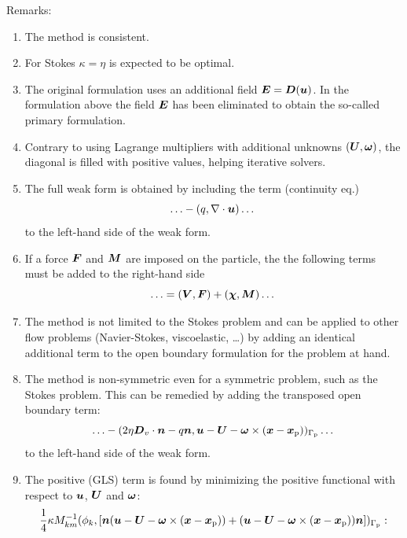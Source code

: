 Remarks:
\begin{enumerate}
   \item The method is consistent.
   \item For Stokes $\kappa=\eta$ is expected to be optimal.
   \item The original formulation \cite{choi_alignment_2012,Choi11b} uses
        an additional field $\boldsymbol{E}=\boldsymbol{D}(\boldsymbol{u})$.
        In the formulation above the field $\boldsymbol{E}$
        has been eliminated to obtain the
        so-called primary formulation.
   \item Contrary to using Lagrange multipliers with additional unknowns
$(\boldsymbol{U},\boldsymbol{\omega})$, the diagonal is filled with positive values, helping
  iterative solvers.
   \item The full weak form is obtained by including the term (continuity eq.)
\begin{equation}
   \ldots -(q,\nabla\cdot\boldsymbol{u}) \dots
\end{equation}
to the left-hand side of the weak form.
   \item If a force $\boldsymbol{F}$ and $\boldsymbol{M}$ are imposed on the particle, the
the following terms must be added to the right-hand side
\begin{equation}
   \ldots = (\boldsymbol{V},\boldsymbol{F})+(\boldsymbol{\chi},\boldsymbol{M})\dots
\end{equation}
   \item The method is not limited to the Stokes problem and can be applied to
         other flow problems (Navier-Stokes, viscoelastic, \dots)
         by adding an identical additional term to the open
         boundary formulation for the problem at hand.
   \item The method is non-symmetric even for a symmetric problem, such as the
         Stokes problem. This can be remedied by adding the transposed open
         boundary term:
\begin{equation}
  \ldots  -(2\eta \boldsymbol{D}_v\cdot\boldsymbol{n}-q\boldsymbol{n},
 \boldsymbol{u}-\boldsymbol{U}-\boldsymbol{\omega}\times(\boldsymbol{x} -
      \boldsymbol{x}_\text{p}))_{\Gamma_{\text{p}}} \dots
\end{equation}
to the left-hand side of the weak form.
   \item The positive (GLS) term is found by minimizing the positive
functional with respect to $\boldsymbol{u}$, $\boldsymbol{U}$ and $\boldsymbol{\omega}$:
\begin{multline}
 \frac14\kappa M_{km}^{-1}(\phi_k,[\vek n(\vec u-\vek U-\vek\omega\times(\vek x
- \vek
x_\text{p}))+(\vec u-\vek U-\vek\omega\times(\vek x - \vek
x_\text{p}))\vec n])_{\Gamma_{\text{p}}}:\\

\end{multline}
\end{enumerate}
